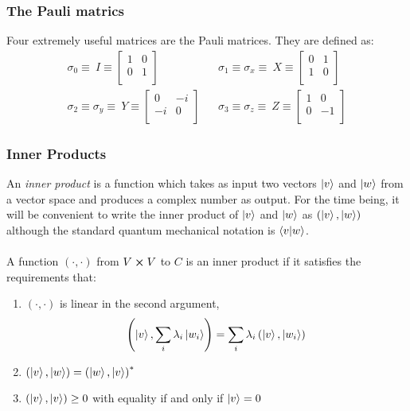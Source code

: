 \subsubsection*{The Pauli matrics}
Four extremely useful matrices are the Pauli matrices. They are defined as:
\begin{align*}
    \sigma_0\equiv\ I\equiv\begin{bmatrix}1&0\\0&1\\\end{bmatrix} && \sigma_1\equiv\sigma_x\equiv\ X\equiv\begin{bmatrix}0&1\\1&0\\\end{bmatrix}\\
    \sigma_2\equiv\sigma_y\equiv\ Y\equiv\begin{bmatrix}0&-i\\-i&0\\\end{bmatrix} && \sigma_3\equiv\sigma_z\equiv\ Z\equiv\begin{bmatrix}1&0\\0&-1\\\end{bmatrix}
\end{align*}

\subsubsection{Inner Products}
An \textit{inner product} is a function which takes as input two vectors $\ket{v}$ and $\ket{w}$ from a vector space and produces a complex number as output. For the time being, it will be convenient to write the inner product of $\ket{v}$ and $\ket{w}$ as $\left(\ket{v}, \ket{w}\right)$ although the standard quantum mechanical notation is $\braket{v}{w}$.
\\\\
A function $(\cdot, \cdot)$ from $V \cross V$ to $C$ is an inner product if it satisfies the requirements that:
\begin{enumerate}
    \item $(\cdot, \cdot)$ is linear in the second argument,
        $$\left(\ket{v}, \sum_{i}{\lambda_i\ket{w_i}}\right) = \sum_{i}{\lambda_i\left(\ket{v}, \ket{w_i}\right)}$$
    \item $\left(\ket{v}, \ket{w}\right) = \left(\ket{w}, \ket{v}\right)^\ast$
    \item $\left(\ket{v}, \ket{v}\right) \geq 0$ with equality if and only if $\ket{v} = 0$
\end{enumerate}

